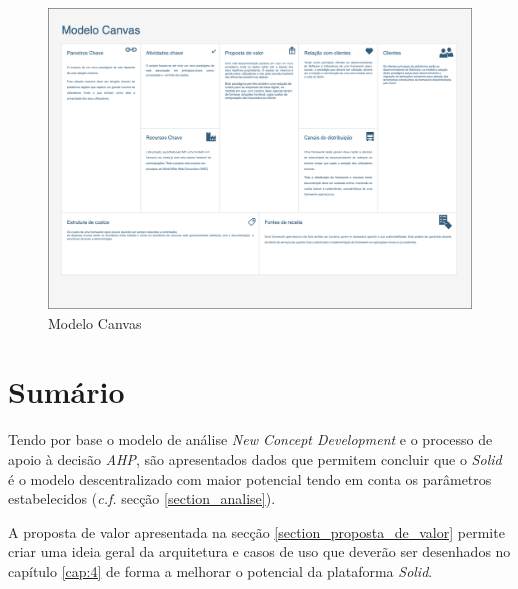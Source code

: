 \begin{figure}[H]
    \begin{center}
    \includegraphics[height=0.9 \textwidth, angle=90]{figures/Canvas-Canvas.png}
    \caption{Modelo Canvas}
    \end{center}
\end{figure}

\section{Sumário}
Tendo por base o modelo de análise \emph{New Concept Development} e o processo de apoio à decisão \emph{AHP}, são apresentados dados que permitem concluir que o \emph{Solid} é o modelo descentralizado com maior potencial tendo em conta os parâmetros estabelecidos (\emph{c.f.} secção \ref{section_analise}).

A proposta de valor apresentada na secção \ref{section_proposta_de_valor} permite criar uma ideia geral da arquitetura e casos de uso que deverão ser desenhados no capítulo \ref{cap:4} de forma a melhorar o potencial da plataforma \emph{Solid}.

